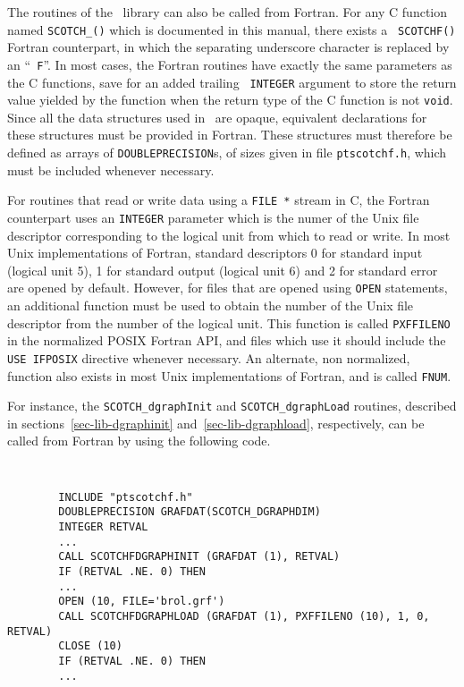 The routines of the \libscotch\ library can also be called from
Fortran. For any C function named {\tt SCOTCH\_()} which is documented in this manual, there exists a {\tt
SCOTCHF()} Fortran counterpart, in which
the separating underscore character is replaced by an ``{\tt
F}''. In most cases, the Fortran routines have exactly the same
parameters as the C functions, save for an added trailing {\tt
INTEGER} argument to store the return value yielded by the function
when the return type of the C function is not {\tt void}.
\\

Since all the data structures used in \libscotch\ are
opaque, equivalent declarations for these structures must
be provided in Fortran. These structures must therefore
be defined as arrays of {\tt DOUBLEPRECISION}s, of sizes
given in file {\tt ptscotchf.h}, which must be included whenever
necessary.

For routines that read or write data using a {\tt FILE~*} stream
in C, the Fortran counterpart uses an {\tt INTEGER} parameter which
is the numer of the Unix file descriptor corresponding to the logical
unit from which to read or write. In most Unix implementations of
Fortran, standard descriptors 0 for standard input (logical unit 5),
1 for standard output (logical unit 6) and 2 for standard error are
opened by default. However, for files that are opened using
{\tt OPEN} statements, an additional function must be used to obtain
the number of the Unix file descriptor from the number of the logical
unit. This function is called \texttt{PXFFILENO} in the normalized
POSIX Fortran API, and files which use it should include the
\texttt{USE IFPOSIX} directive whenever necessary. An alternate, non
normalized, function also exists in most Unix implementations of
Fortran, and is called {\tt FNUM}.

For instance, the {\tt SCOTCH\_\lbt dgraph\lbt Init} and
{\tt SCOTCH\_\lbt dgraph\lbt Load} routines, described in
sections~\ref{sec-lib-dgraphinit} and~\ref{sec-lib-dgraphload},
respectively, can be called from Fortran by using the following code.
{\tt
\begin{verbatim}
        INCLUDE "ptscotchf.h"
        DOUBLEPRECISION GRAFDAT(SCOTCH_DGRAPHDIM)
        INTEGER RETVAL
        ...
        CALL SCOTCHFDGRAPHINIT (GRAFDAT (1), RETVAL)
        IF (RETVAL .NE. 0) THEN
        ...
        OPEN (10, FILE='brol.grf')
        CALL SCOTCHFDGRAPHLOAD (GRAFDAT (1), PXFFILENO (10), 1, 0, RETVAL)
        CLOSE (10)
        IF (RETVAL .NE. 0) THEN
        ...
\end{verbatim}
}

